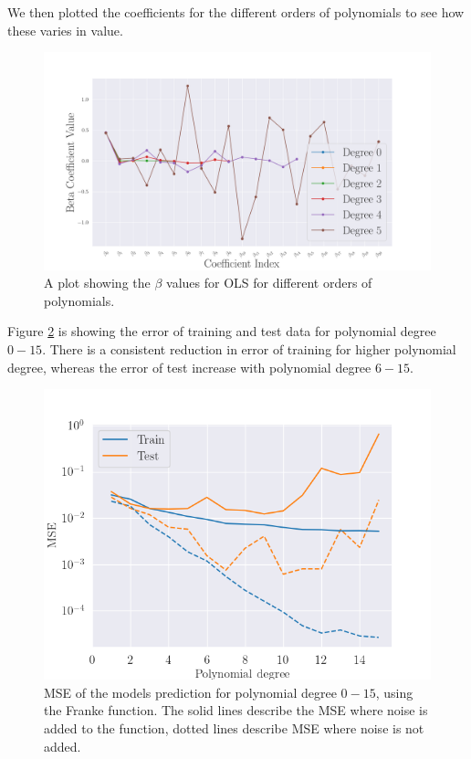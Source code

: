 \noindent We then plotted the coefficients for the different orders of polynomials to see how these varies in value.
\begin{figure}[H]
	\centering
	\includegraphics[width=\linewidth]{images/Figure_12.png}
	\caption{A plot showing the $\beta$ values for OLS for different orders of polynomials.}
	\label{beta OLS}
\end{figure}
%
\noindent Figure \ref{fig:bootstrap_error} is showing the error of training and test data for polynomial degree $0-15$. There is a consistent reduction in error of training for higher polynomial degree, whereas the error of test increase with polynomial degree $6-15$.
\begin{figure}[H]
	\centering
	\includegraphics[width=\linewidth]{images/bootstrap_error.png}
	\caption{MSE of the models prediction for polynomial degree $0-15$, using the Franke function. The solid lines describe the MSE where noise is added to the function, dotted lines describe MSE where noise is not added.}
    \label{fig:bootstrap_error}
\end{figure}
